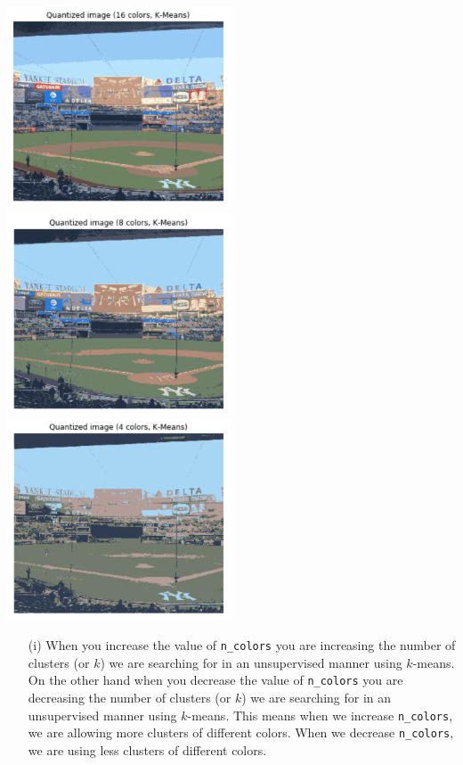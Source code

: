 \documentclass[a4paper]{article}
\begin{document}
\begin{itemize}
    \includegraphics[width=0.5\textwidth]{16colors.jpg}\\
    \includegraphics[width=0.5\textwidth]{8colors.jpg}
    \includegraphics[width=0.5\textwidth]{4colors.jpg}
    \begin{itemize}
        \item[(i)] When you increase the value of \verb|n_colors| you are increasing the number 
        of clusters (or $k$) we are searching for in an unsupervised manner using $k$-means.  
        On the other hand when you decrease the value of \verb|n_colors| you are decreasing the 
        number of clusters (or $k$) we are searching for in an unsupervised manner using $k$-means.  
        This means when we increase \verb|n_colors|, we are allowing more clusters of different 
        colors.  When we decrease \verb|n_colors|, we are using less clusters of different colors.  

\end{itemize}
\end{itemize}
\end{document}
